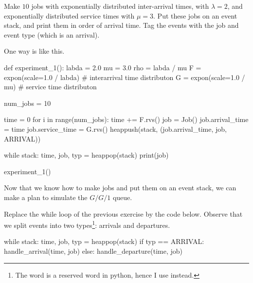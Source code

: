 \begin{exercise}\label{ex:3}
  Make $10$ jobs with exponentially distributed inter-arrival times, with $\lambda=2$,  and exponentially distributed service times with $\mu=3$. Put these jobs on an event stack, and print them in order of arrival time. Tag the events with the job and event type (which is an arrival).
\begin{solution}
One way is like this.
    \begin{pyverbatim}
def experiment_1():
    labda = 2.0
    mu = 3.0
    rho = labda / mu
    F = expon(scale=1.0 / labda)  # interarrival time distributon
    G = expon(scale=1.0 / mu)  # service time distributon

    num_jobs = 10

    time = 0
    for i in range(num_jobs):
        time += F.rvs()
        job = Job()
        job.arrival_time = time
        job.service_time = G.rvs()
        heappush(stack, (job.arrival_time, job, ARRIVAL))

    while stack:
        time, job, typ = heappop(stack)
        print(job)


experiment_1()
    \end{pyverbatim}
  \end{solution}
\end{exercise}

Now that we know how to make jobs and put them on an event stack, we can make a plan to simulate the $G/G/1$ queue.

Replace the while loop of the previous exercise by the code below.
Observe that we split events into two types\footnote{The word  is a reserved word in python, hence I use  instead.}: arrivals and departures.
\begin{pynotangle}
while stack:
    time, job, typ = heappop(stack)
    if typ == ARRIVAL:
        handle_arrival(time, job)
    else:
        handle_departure(time, job)
\end{pynotangle}

